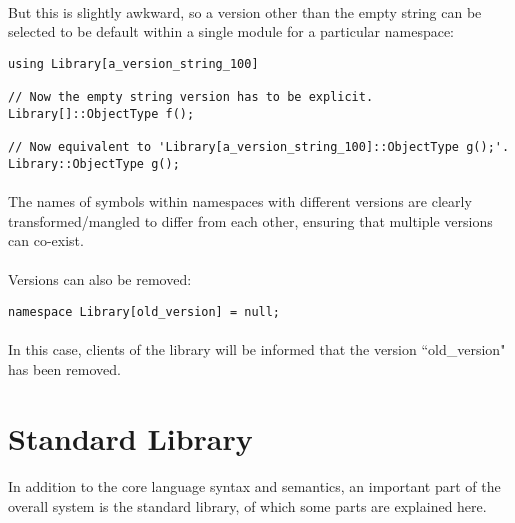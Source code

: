 \documentclass[12pt,twoside,notitlepage]{report}
\begin{document}
\paragraph{}
But this is slightly awkward, so a version other than the empty string can be selected to be default within a single module for a particular namespace:

\begin{lstlisting}
using Library[a_version_string_100]

// Now the empty string version has to be explicit.
Library[]::ObjectType f();

// Now equivalent to 'Library[a_version_string_100]::ObjectType g();'.
Library::ObjectType g();
\end{lstlisting}

\paragraph{}
The names of symbols within namespaces with different versions are clearly transformed/mangled to differ from each other, ensuring that multiple versions can co-exist.

\paragraph{}
Versions can also be removed:

\begin{lstlisting}
namespace Library[old_version] = null;
\end{lstlisting}

\paragraph{}
In this case, clients of the library will be informed that the version ``old\_version" has been removed.

\clearpage

\section{Standard Library}

\paragraph{}
In addition to the core language syntax and semantics, an important part of the overall system is the standard library, of which some parts are explained here.
\end{document}
